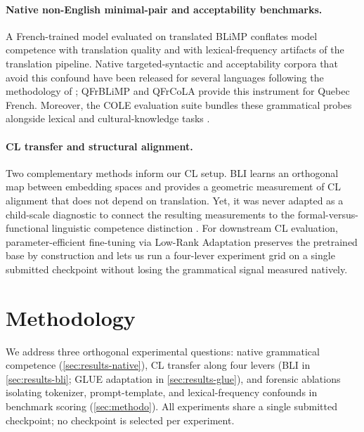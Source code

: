 \documentclass[11pt]{article}
\begin{document}
\paragraph{Native non-English minimal-pair and acceptability benchmarks.} A French-trained model evaluated on translated BLiMP conflates model competence with translation quality and with lexical-frequency artifacts of the translation pipeline. 
Native targeted-syntactic and acceptability corpora that avoid this confound have been released for several languages following the methodology of \citet{warstadt2020blimp}; QFrBLiMP \citep{beauchemin2025qfrblimp} and QFrCoLA \citep{beauchemin2025qfrcola} provide this instrument for Quebec French. 
Moreover, the COLE evaluation suite \citep{beauchemin2025cole} bundles these grammatical probes alongside lexical and cultural-knowledge tasks \citep{beauchemin2025qfrcore}.

\paragraph{CL transfer and structural alignment.} Two complementary methods inform our CL setup. 
BLI learns an orthogonal map between embedding spaces \citep{mikolov2013bli,conneau2018muse} and provides a geometric measurement of CL alignment that does not depend on translation. Yet, it was never adapted as a child-scale diagnostic to connect the resulting measurements to the formal-versus-functional linguistic competence distinction \citep{mahowald2024dissociating}. For downstream CL evaluation, parameter-efficient fine-tuning via Low-Rank Adaptation \citep{hu2021lora} preserves the pretrained base by construction and lets us run a four-lever experiment grid on a single submitted checkpoint without losing the grammatical signal measured natively.

\section{Methodology}
\label{sec:approach}

We address three orthogonal experimental questions: native grammatical competence (\autoref{sec:results-native}), CL transfer along four levers (BLI in \autoref{sec:results-bli}; GLUE adaptation in \autoref{sec:results-glue}), and forensic ablations isolating tokenizer, prompt-template, and lexical-frequency confounds in benchmark scoring (\autoref{sec:methodo}). All experiments share a single submitted checkpoint; no checkpoint is selected per experiment.
\end{document}
